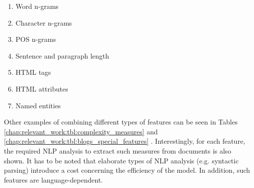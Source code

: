 \begin{enumerate}
\item Word n-grams
\item Character n-grams
\item POS n-grams
\item Sentence and paragraph length
\item HTML tags
\item HTML attributes
\item Named entities
\end{enumerate}

Other examples of combining different types of features can be seen in Tables \ref{chap:relevant_work:tbl:complexity_measures} and \ref{chap:relevant_work:tbl:blogs_special_features} \parencite{strobel2018text,virik2017blog}. Interestingly, for each feature, the required NLP analysis to extract such measures from documents is also shown. It has to be noted that elaborate types of NLP analysis (e.g. syntactic parsing) introduce a cost concerning the efficiency of the model. In addition, such features are language-dependent.

